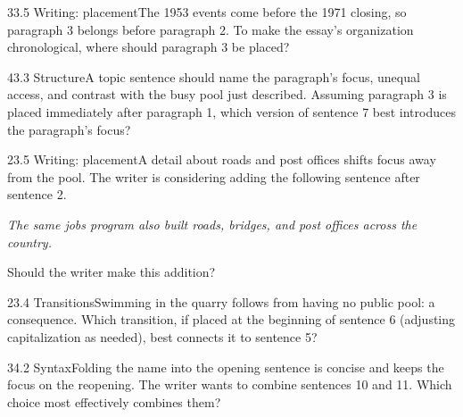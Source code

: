 \documentclass[11pt]{article}
\begin{document}
\begin{q}{3}{3.5 Writing: placement}{The 1953 events come before the 1971 closing, so paragraph 3 belongs before paragraph 2.}
To make the essay's organization chronological, where should paragraph 3 be placed?
\end{q}

\begin{q}{4}{3.3 Structure}{A topic sentence should name the paragraph's focus, unequal access, and contrast with the busy pool just described.}
Assuming paragraph 3 is placed immediately after paragraph 1, which version of sentence 7 best introduces the paragraph's focus?
\end{q}

\begin{q}{2}{3.5 Writing: placement}{A detail about roads and post offices shifts focus away from the pool.}
The writer is considering adding the following sentence after sentence 2.

\emph{The same jobs program also built roads, bridges, and post offices across the country.}

Should the writer make this addition?
\end{q}

\begin{q}{2}{3.4 Transitions}{Swimming in the quarry follows from having no public pool: a consequence.}
Which transition, if placed at the beginning of sentence 6 (adjusting capitalization as needed), best connects it to sentence 5?
\end{q}

\begin{q}{3}{4.2 Syntax}{Folding the name into the opening sentence is concise and keeps the focus on the reopening.}
The writer wants to combine sentences 10 and 11. Which choice most effectively combines them?
\end{q}
\end{document}
